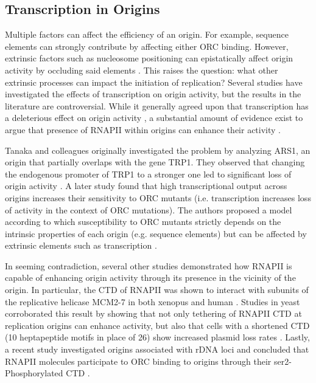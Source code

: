 \subsection{Transcription in Origins}

Multiple factors can affect the efficiency of an origin.  
For example, sequence elements can strongly contribute by affecting either ORC binding. 
However, extrinsic factors such as nucleosome positioning can epistatically affect origin activity by occluding said elements \cite{bodmerglavas:2001:rna}. 
This raises the question: what other extrinsic processes can impact the initiation of replication? Several studies have investigated the effects of transcription on origin activity, but the results in the literature are controversial. 
While it generally agreed upon that transcription has a deleterious effect on origin activity \cite{tanaka:1994:transcription,nieduszynski:2005:requirement}, a substantial amount of evidence exist to argue that presence of RNAPII within origins can enhance their activity \cite{yankulov:1999:mcm,gauthier:2002:role}. 


Tanaka and colleagues originally investigated the problem by analyzing ARS1, an origin that partially overlaps with the gene TRP1. 
They observed that changing the endogenous promoter of TRP1 to a stronger one led to significant loss of origin activity \cite{tanaka:1994:transcription}.
A later study found that high transcriptional output across origins increases their sensitivity to ORC mutants (i.e. transcription increases loss of activity in the context of ORC mutations). 
The authors proposed a model according to which susceptibility to ORC mutants strictly depends on the intrinsic properties of each origin (e.g. sequence elements) but can be affected by extrinsic elements such as transcription \cite{nieduszynski:2005:requirement}. 


In seeming contradiction, several other studies demonstrated how RNAPII is capable of enhancing origin activity through its presence in the vicinity of the origin. 
In particular, the CTD of RNAPII was shown to interact with subunits of the replicative helicase MCM2-7 in both xenopus and human \cite{yankulov:1999:mcm}. 
Studies in yeast corroborated this result by showing that not only tethering of RNAPII CTD at replication origins can enhance activity, but also that cells with a shortened CTD (10 heptapeptide motifs in place of 26) show increased plasmid loss rates \cite{gauthier:2002:role}. 
Lastly, a recent study investigated origins associated with rDNA loci and concluded that RNAPII molecules participate to ORC binding to origins through their  ser2-Phosphorylated CTD \cite{mayan:2013:rnapii}. 


